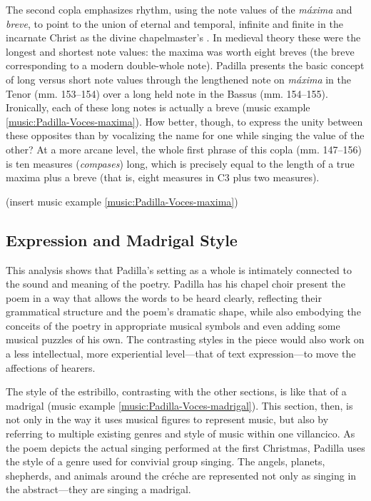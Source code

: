 The second copla emphasizes rhythm, using the note values of the \emph{máxima} and
\emph{breve}, to point to the union of eternal and temporal, infinite and finite in
the incarnate Christ as the divine chapelmaster's .
In medieval theory these were the longest and shortest note values: the maxima
was worth eight breves (the breve corresponding to a modern double-whole note).
Padilla presents the basic concept of long versus short note values through the
lengthened note on \emph{máxima} in the Tenor (mm. 153--154) over a long held note
in the Bassus (mm. 154--155).
Ironically, each of these long notes is actually a breve (music example
\ref{music:Padilla-Voces-maxima}).
How better, though, to express the unity between these opposites than by
vocalizing the name for one while singing the value of the other?
At a more arcane level, the whole first phrase of this copla (mm. 147--156) is
ten measures (\emph{compases}) long, which is precisely equal to the length of a true
maxima plus a breve (that is, eight measures in C3 plus two measures).

(insert music example \ref{music:Padilla-Voces-maxima})
\label{music:Padilla-Voces-maxima}

\subsection{Expression and Madrigal Style}

This analysis shows that Padilla's setting as a whole is intimately connected to
the sound and meaning of the poetry.
Padilla has his chapel choir present the poem in a way that allows the words to
be heard clearly, reflecting their grammatical structure and the poem's dramatic
shape, while also embodying the conceits of the poetry in appropriate musical
symbols and even adding some musical puzzles of his own.
The contrasting styles in the piece would also work on a less intellectual, more
experiential level---that of text expression---to move the affections of hearers.

The style of the estribillo, contrasting with the other sections, is like
that of a madrigal (music example \ref{music:Padilla-Voces-madrigal}).
This section, then, is  not only in the way it uses musical
figures to represent music, but also by referring to multiple existing genres
and style of music within one villancico.
As the poem depicts the actual singing performed at the first Christmas, Padilla
uses the style of a genre used for convivial group singing.
The angels, planets, shepherds, and animals around the créche are represented
not only as singing in the abstract---they are singing a madrigal.

